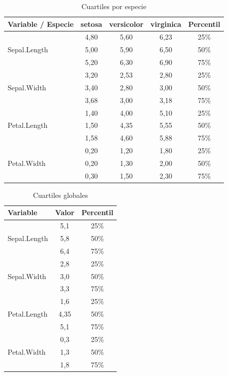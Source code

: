 \documentclass[12pt,a4paper]{article}
\begin{document}
\begin{table}[h!]
\centering
\caption{Cuartiles por especie}
\label{fig:cuartiles}
\begin{tabular}{lcccc}
\toprule
\textbf{Variable / Especie} & \textbf{setosa} & \textbf{versicolor} & \textbf{virginica} & \textbf{Percentil} \\
\midrule
\multirow{3}{*}{Sepal.Length} & 4,80 & 5,60 & 6,23 & 25\% \\
                               & 5,00 & 5,90 & 6,50 & 50\% \\
                               & 5,20 & 6,30 & 6,90 & 75\% \\
\midrule
\multirow{3}{*}{Sepal.Width}  & 3,20 & 2,53 & 2,80 & 25\% \\
                               & 3,40 & 2,80 & 3,00 & 50\% \\
                               & 3,68 & 3,00 & 3,18 & 75\% \\
\midrule
\multirow{3}{*}{Petal.Length} & 1,40 & 4,00 & 5,10 & 25\% \\
                               & 1,50 & 4,35 & 5,55 & 50\% \\
                               & 1,58 & 4,60 & 5,88 & 75\% \\
\midrule
\multirow{3}{*}{Petal.Width}  & 0,20 & 1,20 & 1,80 & 25\% \\
                               & 0,20 & 1,30 & 2,00 & 50\% \\
                               & 0,30 & 1,50 & 2,30 & 75\% \\
\bottomrule
\end{tabular}
\end{table}

\begin{table}[h!]
\centering
\caption{Cuartiles globales}
\label{fig:cuartiles_globales}
\begin{tabular}{lcc}
\toprule
\textbf{Variable} & \textbf{Valor} & \textbf{Percentil} \\
\midrule
\multirow{3}{*}{Sepal.Length} & 5,1 & 25\% \\
                               & 5,8 & 50\% \\
                               & 6,4 & 75\% \\
\midrule
\multirow{3}{*}{Sepal.Width}  & 2,8 & 25\% \\
                               & 3,0 & 50\% \\
                               & 3,3 & 75\% \\
\midrule
\multirow{3}{*}{Petal.Length} & 1,6  & 25\% \\
                               & 4,35 & 50\% \\
                               & 5,1  & 75\% \\
\midrule
\multirow{3}{*}{Petal.Width}  & 0,3 & 25\% \\
                               & 1,3 & 50\% \\
                               & 1,8 & 75\% \\
\bottomrule
\end{tabular}
\end{table}
\end{document}
